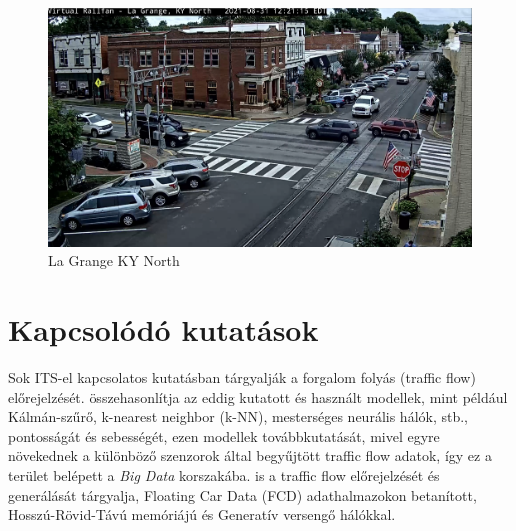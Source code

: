 \documentclass[acmtog, authorversion]{acmart}
\begin{document}
\begin{figure}
    \includegraphics[width=1\columnwidth]{dataset_samples/lagrange_kynorth.png}
    \caption{La Grange KY North}
    \label{lagrangekynorth}
\end{figure}

\section{Kapcsolódó kutatások}
Sok ITS-el kapcsolatos kutatásban tárgyalják a forgalom folyás (traffic flow) előrejelzését. \cite{PAUL2017177} összehasonlítja az eddig
kutatott és használt modellek, mint például Kálmán-szűrő, k-nearest neighbor (k-NN), mesterséges neurális hálók, stb., pontosságát és
sebességét, ezen modellek továbbkutatását, mivel egyre növekednek a különböző szenzorok által  begyűjtött traffic flow adatok, így ez a terület belépett
a \emph{Big Data} korszakába. \cite{10.1371/journal.pone.0253868} is a traffic flow előrejelzését és generálását tárgyalja, Floating Car Data (FCD) 
adathalmazokon betanított, Hosszú-Rövid-Távú memóriájú és Generatív versengő hálókkal.
\end{document}
